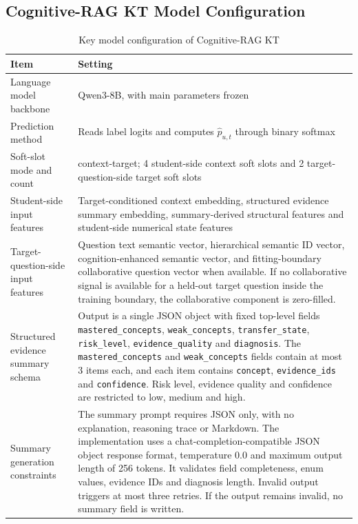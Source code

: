 \documentclass[a4paper,12pt]{article}
\numberwithin{table}{section}
\begin{document}
\subsection{Cognitive-RAG KT Model Configuration}

\begin{table}[htbp]
\centering
\small
\caption{Key model configuration of Cognitive-RAG KT}
\label{tab:appendix-main-method-config}
\begin{tabularx}{\textwidth}{p{3.8cm}X}
\toprule
\textbf{Item} & \textbf{Setting} \\
\midrule
Language model backbone & Qwen3-8B, with main parameters frozen \\
Prediction method & Reads label logits and computes \(\hat{p}_{u,t}\) through binary softmax \\
Soft-slot mode and count & context-target; 4 student-side context soft slots and 2 target-question-side target soft slots \\
Student-side input features & Target-conditioned context embedding, structured evidence summary embedding, summary-derived structural features and student-side numerical state features \\
Target-question-side input features & Question text semantic vector, hierarchical semantic ID vector, cognition-enhanced semantic vector, and fitting-boundary collaborative question vector when available. If no collaborative signal is available for a held-out target question inside the training boundary, the collaborative component is zero-filled. \\
Structured evidence summary schema & Output is a single JSON object with fixed top-level fields \texttt{mastered\_concepts}, \texttt{weak\_concepts}, \texttt{transfer\_state}, \texttt{risk\_level}, \texttt{evidence\_quality} and \texttt{diagnosis}. The \texttt{mastered\_concepts} and \texttt{weak\_concepts} fields contain at most 3 items each, and each item contains \texttt{concept}, \texttt{evidence\_ids} and \texttt{confidence}. Risk level, evidence quality and confidence are restricted to low, medium and high. \\
Summary generation constraints & The summary prompt requires JSON only, with no explanation, reasoning trace or Markdown. The implementation uses a chat-completion-compatible JSON object response format, temperature 0.0 and maximum output length of 256 tokens. It validates field completeness, enum values, evidence IDs and diagnosis length. Invalid output triggers at most three retries. If the output remains invalid, no summary field is written. \\

\end{tabularx}
\end{table}
\end{document}
